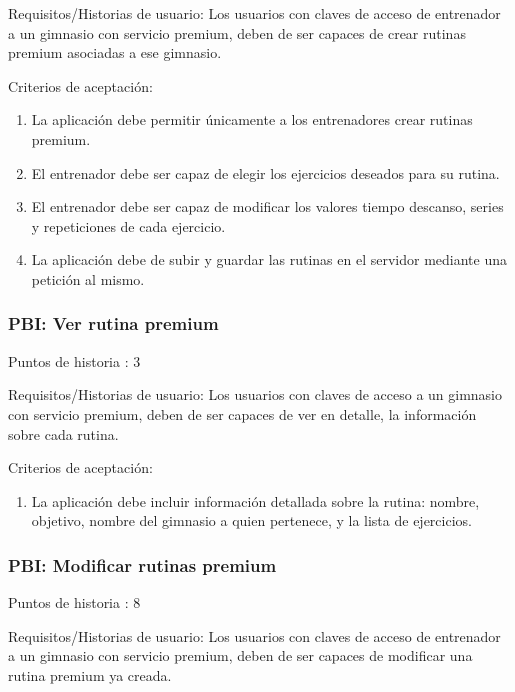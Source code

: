\documentclass[11pt,a4paper]{report}
\begin{document}
Requisitos/Historias de usuario: Los usuarios con claves de acceso de entrenador a un gimnasio con servicio premium, deben de ser capaces de crear rutinas premium asociadas a ese gimnasio.

Criterios de aceptación:
\begin{enumerate}
	\item La aplicación debe permitir únicamente a los entrenadores crear rutinas premium.

	\item El entrenador debe ser capaz de elegir los ejercicios deseados para su rutina.

	\item El entrenador debe ser capaz de modificar los valores tiempo descanso, series y repeticiones de cada ejercicio.

	\item La aplicación debe de subir y guardar las rutinas en el servidor mediante una petición al mismo.

\end{enumerate}
\subsubsection{PBI: Ver rutina premium}
Puntos de historia : 3

Requisitos/Historias de usuario: Los usuarios con claves de acceso a un gimnasio con servicio premium, deben de ser capaces de ver en detalle, la información sobre cada rutina.

Criterios de aceptación:
\begin{enumerate}
	\item La aplicación debe incluir información detallada sobre la rutina: nombre, objetivo, nombre del gimnasio a quien pertenece, y la lista de ejercicios.

\end{enumerate}
\subsubsection{PBI: Modificar rutinas premium}

Puntos de historia : 8

Requisitos/Historias de usuario: Los usuarios con claves de acceso de entrenador a un gimnasio con servicio premium, deben de ser capaces de modificar una rutina premium ya creada.
\end{document}
